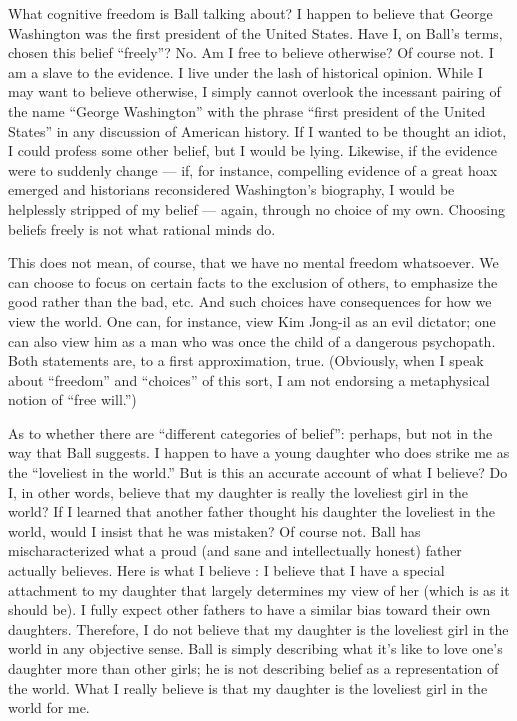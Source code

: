\documentclass[a4paper,14pt]{extbook}
\begin{document}
What cognitive freedom is Ball talking about?
I happen to believe that George Washington was the first president of the United States.
Have I, on Ball’s terms, chosen this belief ``freely''?
No.
Am I free to believe otherwise?
Of course not.
I am a slave to the evidence.
I live under the lash of historical opinion.
While I may want to believe otherwise, I simply cannot overlook the incessant pairing of the name ``George Washington'' with the phrase ``first president of the United States'' in any discussion of American history.
If I wanted to be thought an idiot, I could profess some other belief, but I would be lying.
Likewise, if the evidence were to suddenly change --- if, for instance, compelling evidence of a great hoax emerged and historians reconsidered Washington’s biography, I would be helplessly stripped of my belief --- again, through no choice of my own.
Choosing beliefs freely is not what rational minds do.

This does not mean, of course, that we have no mental freedom whatsoever.
We can choose to focus on certain facts to the exclusion of others, to emphasize the good rather than the bad, etc.
And such choices have consequences for how we view the world.
One can, for instance, view Kim Jong-il as an evil dictator;
one can also view him as a man who was once the child of a dangerous psychopath.
Both statements are, to a first approximation, true.
(Obviously, when I speak about ``freedom'' and ``choices'' of this sort, I am not endorsing a metaphysical notion of ``free will.'')

As to whether there are ``different categories of belief'':
perhaps, but not in the way that Ball suggests.
I happen to have a young daughter who does strike me as the ``loveliest in the world.''
But is this an accurate account of what I believe?
Do I, in other words, believe that my daughter is really the loveliest girl in the world?
If I learned that another father thought his daughter the loveliest in the world, would I insist that he was mistaken?
Of course not.
Ball has mischaracterized what a proud (and sane and intellectually honest) father actually believes.
Here is what I believe :
I believe that I have a special attachment to my daughter that largely determines my view of her (which is as it should be).
I fully expect other fathers to have a similar bias toward their own daughters.
Therefore, I do not believe that my daughter is the loveliest girl in the world in any objective sense.
Ball is simply describing what it’s like to love one’s daughter more than other girls;
he is not describing belief as a representation of the world.
What I really believe is that my daughter is the loveliest girl in the world for me.
\end{document}
